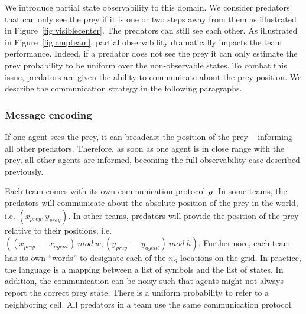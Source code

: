 We introduce partial state observability to this domain. We consider predators that can only see the prey if it is one or two steps away from them as illustrated in Figure~\ref{fig:visiblecenter}. The predators can still see each other. As illustrated in Figure~\ref{fig:cmpteam}, partial observability dramatically impacts the team performance. Indeed, if a predator does not see the prey it can only estimate the prey probability to be uniform over the non-observable states. To combat this issue, predators are given the ability to communicate about the prey position. We describe the communication strategy in the following paragraphs.


\subsubsection*{Message encoding} If one agent sees the prey, it can broadcast the position of the prey -- informing all other predators. Therefore, as soon as one agent is in close range with the prey, all other agents are informed, becoming the full observability case described previously. %

Each team comes with its own communication protocol $\rho$. In some teams, the predators will communicate about the absolute position of the prey in the world, i.e. $(x_{prey},y_{prey})$. In other teams, predators will provide the position of the prey relative to their positions, i.e. $((x_{prey}~-~x_{agent}) ~mod~w, (y_{prey}~-~y_{agent})~mod~h)$. Furthermore, each team has its own ``words'' to designate each of the $n_S$ locations on the grid. In practice, the language is a mapping between a list of symbols and the list of states. In addition, the communication can be noisy such that agents might not always report the correct prey state. There is a uniform probability to refer to a neighboring cell. All predators in a team use the same communication protocol.

